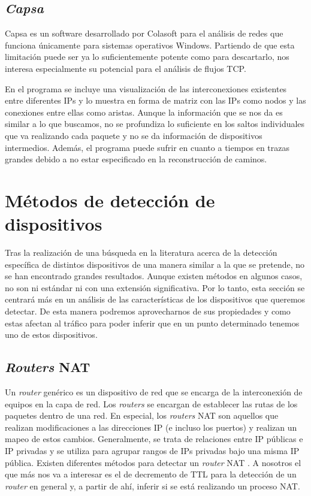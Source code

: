 \documentclass[twoside, 12pt]{epstfg}
\begin{document}
\subsection{\textit{Capsa}} 
Capsa \cite{ColasoftCapsa} es un software desarrollado por Colasoft para el análisis de redes que funciona únicamente para sistemas operativos Windows. Partiendo de que esta limitación puede ser ya lo suficientemente potente como para descartarlo, nos interesa especialmente su potencial para el análisis de flujos TCP.

En el programa se incluye una visualización de las interconexiones existentes entre diferentes IPs y lo muestra en forma de matriz con las IPs como nodos y las conexiones entre ellas como aristas. Aunque la información que se nos da es similar a lo que buscamos, no se profundiza lo suficiente en los saltos individuales que va realizando cada paquete y no se da información de dispositivos intermedios. Además, el programa puede sufrir en cuanto a tiempos en trazas grandes debido a no estar especificado en la reconstrucción de caminos. %

\section{Métodos de detección de dispositivos}
Tras la realización de una búsqueda en la literatura acerca de la detección específica de distintos dispositivos de una manera similar a la que se pretende, no se han encontrado grandes resultados. Aunque existen métodos en algunos casos, no son ni estándar ni con una extensión significativa. Por lo tanto, esta sección se centrará más en un análisis de las características de los dispositivos que queremos detectar. De esta manera podremos aprovecharnos de sus propiedades y como estas afectan al tráfico para poder inferir que en un punto determinado tenemos uno de estos dispositivos.

\subsection{\textit{Routers} NAT} %
Un \textit{router} genérico es un dispositivo de red que se encarga de la interconexión de equipos en la capa de red. Los \textit{routers} se encargan de establecer las rutas de los paquetes dentro de una red. En especial, los \textit{routers} NAT son aquellos que realizan modificaciones a las direcciones IP (e incluso los puertos) y realizan un mapeo de estos cambios. Generalmente, se trata de relaciones entre IP públicas e IP privadas y se utiliza para agrupar rangos de IPs privadas bajo una misma IP pública. Existen diferentes métodos para detectar un \textit{router} NAT \cite{Krmicek}. A nosotros el que más nos va a interesar es el de decremento de TTL para la detección de un \textit{router} en general y, a partir de ahí, inferir si se está realizando un proceso NAT.
\end{document}
